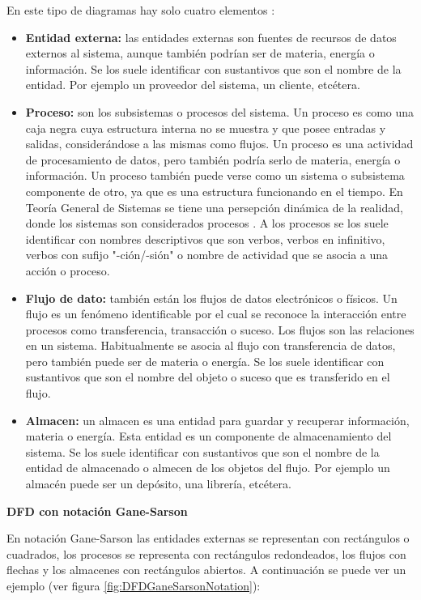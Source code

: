 En este tipo de diagramas hay solo cuatro elementos \cite{Dixit-2007}:
\begin{itemize}
\item \textbf{Entidad externa:} las entidades externas son fuentes de recursos de datos externos al sistema, aunque también podrían ser de materia, energía o información. Se los suele identificar con sustantivos que son el nombre de la entidad. Por ejemplo un proveedor del sistema, un cliente, etcétera.

\item \textbf{Proceso:} son los subsistemas o procesos del sistema. Un proceso es como una caja negra cuya estructura interna no se muestra y que posee entradas y salidas, considerándose a las mismas como flujos. Un proceso es una actividad de procesamiento de datos, pero también podría serlo de materia, energía o información. Un proceso también puede verse como un sistema o subsistema componente de otro, ya que es una estructura funcionando en el tiempo. En Teoría General de Sistemas se tiene una persepción dinámica de la realidad, donde los sistemas son considerados procesos \cite{Sarabia-1995}. A los procesos se los suele identificar con nombres descriptivos que son verbos, verbos en infinitivo, verbos con sufijo "-ción/-sión" o nombre de actividad que se asocia a una acción o proceso.

\item \textbf{Flujo de dato:} también están los flujos de datos electrónicos o físicos. Un flujo es un fenómeno identificable por el cual se reconoce la interacción entre procesos como transferencia, transacción o suceso. Los flujos son las relaciones en un sistema. Habitualmente se asocia al flujo con transferencia de datos, pero también puede ser de materia o energía. Se los suele identificar con sustantivos que son el nombre del objeto o suceso que es transferido en el flujo.

\item \textbf{Almacen:} un almacen es una entidad para guardar y recuperar información, materia o energía. Esta entidad es un componente de almacenamiento del sistema. Se los suele identificar con sustantivos que son el nombre de la entidad de almacenado o almecen de los objetos del flujo. Por ejemplo un almacén puede ser un depósito, una librería, etcétera.

\end{itemize}

\textbf{DFD con notación Gane-Sarson}

En notación Gane-Sarson las entidades externas se representan con rectángulos o cuadrados, los procesos se representa con rectángulos redondeados, los flujos con flechas y los almacenes con rectángulos abiertos. A continuación se puede ver un ejemplo (ver figura \ref{fig:DFDGaneSarsonNotation}):\newline
\newline

